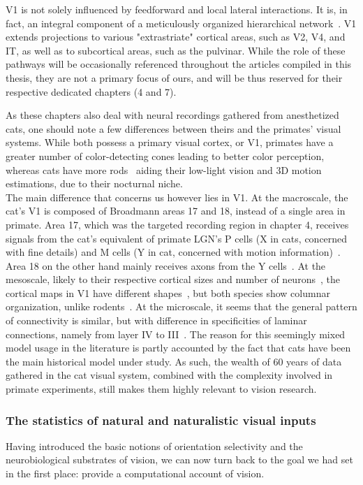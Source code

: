 V1 is not solely influenced by feedforward and local lateral interactions. It is, in fact, an integral component of a meticulously organized hierarchical network~\cite{scannell1995analysis}. \gls{V1} extends projections to various "extrastriate" cortical areas, such as V2, V4, and IT, as well as to subcortical areas, such as the pulvinar. While the role of these pathways will be occasionally referenced throughout the articles compiled in this thesis, they are not a primary focus of ours, and will be thus reserved for their respective dedicated chapters (4 and 7).

As these chapters also deal with neural recordings gathered from anesthetized cats, one should note a few differences between theirs and the primates' visual systems.
While both possess a primary visual cortex, or \gls{V1}, primates have a greater number of color-detecting cones leading to better color perception, whereas cats have more rods~\cite{sterling1983microcircuitry, kolb1984neural} aiding their low-light vision and 3D motion estimations, due to their nocturnal niche. \\
The main difference that concerns us however lies in \gls{V1}. At the macroscale, the cat's \gls{V1} is composed of Broadmann areas 17 and 18, instead of a single area in primate. Area 17, which was the targeted recording region in chapter 4, receives signals from the cat's equivalent of primate \gls{LGN}'s P cells (X in cats, concerned with fine details) and M cells (Y in cat, concerned with motion information)~\cite{stone1973projection}. Area 18 on the other hand mainly receives axons from the Y cells~\cite{payne2001cat}. 
At the mesoscale, likely to their respective cortical sizes and number of neurons~\cite{kaschube2014neural}, the cortical maps in \gls{V1} have different shapes~\cite{schmidt2021punctuated}, but both species show columnar organization, unlike rodents~\cite{kaas2022escaping}. 
At the microscale, it seems that the general pattern of connectivity is similar, but with difference in specificities of laminar connections, namely from layer IV to III~\cite{lund1979anatomical}. 
The reason for this seemingly mixed model usage in the literature is partly accounted by the fact that cats have been the main historical model under study. As such, the wealth of 60 years of data gathered in the cat visual system, combined with the complexity involved in primate experiments, still makes them highly relevant to vision research. 



\subsubsection{The statistics of natural and naturalistic visual inputs}
Having introduced the basic notions of orientation selectivity and the neurobiological substrates of vision, we can now turn back to the goal we had set in the first place: provide a computational account of vision.

